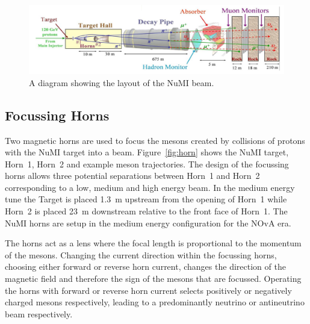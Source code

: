 
\begin{figure}
  \centering
  \includegraphics[width=1\textwidth]{../../img/beam/beam_diagram.png} 
  \caption{A diagram showing the layout of the NuMI beam. \cite{NuMI}}
  \label{fig:NuMI}
\end{figure}

\subsection{Focussing Horns}

Two magnetic horns are used to focus the mesons created 
by collisions of protons with the NuMI target into a
beam. Figure~\ref{fig:horn} shows the NuMI target, Horn~1, Horn~2 and
example meson trajectories. 
The design of the focussing horns allows three potential separations
between 
Horn~1 and Horn~2 corresponding to a low, medium and high
energy beam. 
In the medium energy tune the Target is placed 1.3~m upstream from the
opening of Horn~1 while 
Horn~2 is placed 23~m downstream relative to the front face of Horn~1.
The NuMI horns are setup in the medium energy configuration
for the NOvA era.

The horns act as a lens where the focal
length is proportional to the momentum of the mesons.
Changing the current
direction within the focussing horns, choosing either forward or
reverse horn current, changes the direction of
the magnetic field and therefore the sign
of the mesons that are focussed. Operating the horns with forward or
reverse horn current selects positively or negatively charged mesons
respectively, leading to a predominantly neutrino or antineutrino beam
respectively. 

